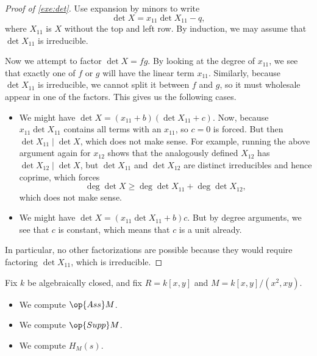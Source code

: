 \begin{proof}[Proof of \autoref{exe:det}]
	Use expansion by minors to write
	\[\det X=x_{11}\det X_{11}-q,\]
	where $X_{11}$ is $X$ without the top and left row. By induction, we may assume that $\det X_{11}$ is irreducible.
	
	Now we attempt to factor $\det X=fg$. By looking at the degree of $x_{11}$, we see that exactly one of $f$ or $g$ will have the linear term $x_{11}$. Similarly, because $\det X_{11}$ is irreducible, we cannot split it between $f$ and $g$, so it must wholesale appear in one of the factors. This gives us the following cases.
	\begin{itemize}
		\item We might have $\det X=(x_{11}+b)(\det X_{11}+c)$. Now, because $x_{11}\det X_{11}$ contains all terms with an $x_{11}$, so $c=0$ is forced. But then $\det X_{11}\mid\det X$, which does not make sense. For example, running the above argument again for $x_{12}$ shows that the analogously defined $X_{12}$ has $\det X_{12}\mid\det X$, but $\det X_{11}$ and $\det X_{12}$ are distinct irreducibles and hence coprime, which forces
		\[\deg\det X\ge\deg\det X_{11}+\deg\det X_{12},\]
		which does not make sense.
		\item We might have $\det X=(x_{11}\det X_{11}+b)c$. But by degree arguments, we see that $c$ is constant, which means that $c$ is a unit already.
	\end{itemize}
	In particular, no other factorizations are possible because they would require factoring $\det X_{11}$, which is irreducible.
\end{proof}
\begin{exe}
	Fix $k$ be algebraically closed, and fix $R=k[x,y]$ and $M=k[x,y]/\left(x^2,xy\right)$.
	\begin{itemize}
		\item We compute $\op{Ass}M$.
		\item We compute $\op{Supp}M$.
		\item We compute $H_M(s)$.
	\end{itemize}
\end{exe}
